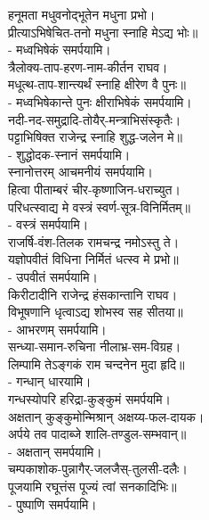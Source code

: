 हनूमता मधुवनोद्भूतेन मधुना प्रभो।\\
प्रीत्याऽभिषेचित-तनो मधुना स्नाहि मेऽद्य भोः॥\\
\namah - मध्वभिषेकं समर्पयामि।\\

त्रैलोक्य-ताप-हरण-नाम-कीर्तन राघव।\\
मधूत्थ-ताप-शान्त्यर्थं स्नाहि क्षीरेण वै पुनः॥\\
\namah - मध्वभिषेकान्ते पुनः क्षीराभिषेकं समर्पयामि।\\

नदी-नद-समुद्रादि-तोयैर्-मन्त्राभिसंस्कृतैः।\\
पट्टाभिषिक्त राजेन्द्र स्नाहि शुद्ध-जलेन मे॥\\
\namah - शुद्धोदक-स्नानं समर्पयामि।\\
स्नानोत्तरम् आचमनीयं समर्पयामि।\\

हित्वा पीताम्बरं चीर-कृष्णाजिन-धराच्युत।\\
परिधत्स्वाद्य मे वस्त्रं स्वर्ण-सूत्र-विनिर्मितम्॥\\
\namah - वस्त्रं समर्पयामि।\\

राजर्षि-वंश-तिलक रामचन्द्र नमोऽस्तु ते।\\
यज्ञोपवीतं विधिना निर्मितं धत्स्व मे प्रभो॥\\
\namah - उपवीतं समर्पयामि।\\

किरीटादीनि राजेन्द्र हंसकान्तानि राघव।\\
विभूषणानि धृत्वाऽद्य शोभस्व सह सीतया॥\\
\namah - आभरणम् समर्पयामि।\\

सन्ध्या-समान-रुचिना नीलाभ्र-सम-विग्रह।\\
लिम्पामि तेऽङ्गकं राम चन्दनेन मुदा हृदि॥\\
\namah - गन्धान् धारयामि।\\
गन्धस्योपरि हरिद्रा-कुङ्कुमं समर्पयमि।\\

अक्षतान् कुङ्कुमोन्मिश्रान् अक्षय्य-फल-दायक।\\
अर्पये तव पादाब्जे शालि-तण्डुल-सम्भवान्॥\\
\namah - अक्षतान् समर्पयामि।\\

चम्पकाशोक-पुन्नागैर्-जलजैस्-तुलसी-दलैः।\\
पूजयामि रघूत्तंस पूज्यं त्वां सनकादिभिः॥\\
\namah - पुष्पाणि समर्पयामि।

